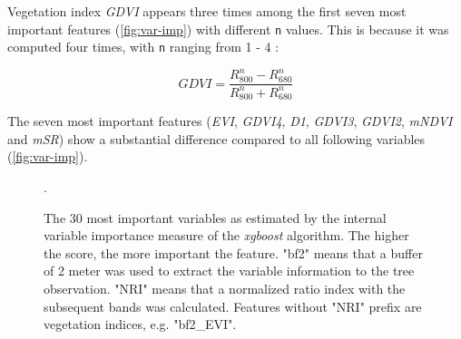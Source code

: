 \documentclass[review]{elsarticle}
\begin{document}
\bigbreak

\noindent Vegetation index \textit{GDVI} appears three times among the first seven most important features (\autoref{fig:var-imp}) with different \texttt{n} values.
This is because it was computed four times, with \texttt{n} ranging from 1 - 4 \citep{wuEstimatingChlorophyllContent2008}:

\begin{equation}
	GDVI = \frac{R_{800}^n-R_{680}^n}{R_{800}^n+R_{680}^n}
\end{equation}

\bigbreak

\noindent The seven most important features (\textit{EVI}, \textit{GDVI4}, \textit{D1}, \textit{GDVI3}, \textit{GDVI2}, \textit{mNDVI} and \textit{mSR}) show a substantial difference compared to all following variables (\autoref{fig:var-imp}).

\begin{figure} [b!]
	\begin{center}
		\caption{The 30 most important variables as estimated by the internal variable importance measure of the \textit{xgboost} algorithm. The higher the score, the more important the feature.
			"bf2" means that a buffer of 2 meter was used to extract the variable information to the tree observation. "NRI" means that a normalized ratio index with the subsequent bands was calculated. Features without "NRI" prefix are vegetation indices, e.g. "bf2\_EVI".}. %
		\label{fig:var-imp}
	\end{center}
\end{figure}
\end{document}
